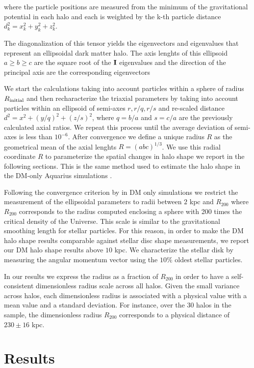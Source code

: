 \documentclass[usenatbib]{mnras}
\begin{document}
where the particle positions are measured from the minimum of the
gravitational potential in each halo and each is weighted by the k-th
particle distance $d_k^2=x_k^2+y_k^2+z_k^2$.

The diagonalization of this tensor yields the eigenvectors and
eigenvalues that represent an ellipsoidal dark matter halo.
The axis lenghts of this ellipsoid $a\geq b \geq c$ are the square
root of the ${\bf I}$ eigenvalues and the direction of the principal
axis are the corresponding eigenvectors 

We start the calculations taking into account particles within a
sphere of radius $R_{\rm initial}$ and then recharacterize the
triaxial parameters 
by taking into account particles within an ellipsoid of semi-axes
$r,r/q,r/s$ and re-scaled distance $d^2=x^2+(y/q)^2+(z/s)^2$, where $q
= b/a$ and $s=c/a$ are the previously calculated axial ratios. 
We repeat this process until the average deviation of semi-axes is
less than $10^{-6}$.  
After convergence we define a unique radius $R$ as the geometrical
mean of the axial lenghts $R=(abc)^{1/3}$.
We use this radial coordinate $R$ to parameterize the spatial changes
in halo shape we report in the following sections.
This is the same method used to estimate the halo shape in the DM-only
Aquarius simulations \citep{VeraCiro11}. 

Following the convergence criterion by \cite{VeraCiro11} in DM only simulations
we restrict the measurement of the ellipsoidal parameters to radii
between $2$ kpc and $R_{200}$ where  $R_{200}$ corresponds to the radius
computed enclosing a sphere with 200 times the critical density of the
Universe. 
This scale is similar to the gravitational smoothing length for
stellar particles. 
For this reason, in order to make the DM halo shape results comparable
against stellar disc shape measurements, we report our DM halo shape
results above $10$ kpc.
We characterize the stellar disk by measuring the angular momentum vector using the $10\%$ oldest stellar particles.

In our results we express the radius as a fraction of $R_{200}$ in
order to have a self-consistent dimensionless radius scale across all
halos. 
Given the small variance across halos, each dimensionless radius is associated with
a physical value with a mean value and a standard deviation.
For instance, over the 30 halos in the sample, the dimensionless
radius $R_{200}$ corresponds to a physical distance of $230\pm 16$
kpc.  


\section{Results}
\label{sec:results}
\end{document}
